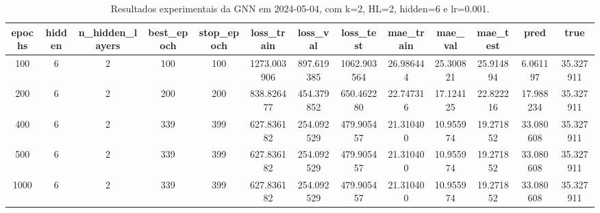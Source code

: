 \begin{table}[h]
\centering
\caption{Resultados experimentais da GNN em 2024-05-04, com k=2, HL=2, hidden=6 e lr=0.001.}
\label{tab:gnn_results_k2_hl2_h6_d20240504}
\begin{tabular}{ccccccccccccc}
\toprule
epochs & hidden & n\_hidden\_layers & best\_epoch & stop\_epoch & loss\_train & loss\_val & loss\_test & mae\_train & mae\_val & mae\_test & pred & true \\
\midrule
100 & 6 & 2 & 100 & 100 & 1273.003906 & 897.619385 & 1062.903564 & 26.986444 & 25.300821 & 25.914894 & 6.061197 & 35.327911 \\
200 & 6 & 2 & 200 & 200 & 838.826477 & 454.379852 & 650.462280 & 22.747316 & 17.124125 & 22.822216 & 17.988234 & 35.327911 \\
400 & 6 & 2 & 339 & 399 & 627.836182 & 254.092529 & 479.905457 & 21.310400 & 10.955974 & 19.271852 & 33.080608 & 35.327911 \\
500 & 6 & 2 & 339 & 399 & 627.836182 & 254.092529 & 479.905457 & 21.310400 & 10.955974 & 19.271852 & 33.080608 & 35.327911 \\
1000 & 6 & 2 & 339 & 399 & 627.836182 & 254.092529 & 479.905457 & 21.310400 & 10.955974 & 19.271852 & 33.080608 & 35.327911 \\
\bottomrule
\end{tabular}
\end{table}
